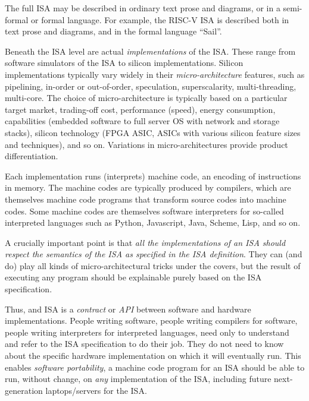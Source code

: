 The full ISA may be described in ordinary text prose and diagrams, or
in a semi-formal or formal language.  For example, the RISC-V ISA is
described both in text prose and diagrams, and in the formal language
``Sail''.


Beneath the ISA level are actual \emph{implementations} of the ISA.
These range from software simulators of the ISA to silicon
implementations.  Silicon implementations typically vary widely in
their \emph{micro-architecture} features, such as pipelining, in-order
or out-of-order, speculation, superscalarity, multi-threading,
multi-core.  The choice of micro-architecture is typically based on a
particular target market, trading-off cost, performance (speed),
energy consumption, capabilities (embedded software to full server OS
with network and storage stacks), silicon technology (FPGA {\vs} ASIC,
ASICs with various silicon feature sizes and techniques), and so on.
Variations in micro-architectures provide product differentiation.


Each implementation runs (interprets) machine code, {\ie} an encoding
of instructions in memory.  The machine codes are typically produced
by compilers, which are themselves machine code programs that
transform source codes into machine codes.  Some machine codes are
themselves software interpreters for so-called interpreted languages
such as Python, Javascript, Java, Scheme, Lisp, and so on.

A crucially important point is that \emph{all the implementations of
an ISA should respect the semantics of the ISA as specified in the ISA
definition}.  They can (and do) play all kinds of micro-architectural
tricks under the covers, but the result of executing any program
should be explainable purely based on the ISA specification.


Thus, and ISA is a \emph{contract} or \emph{API} between software and
hardware implementations.  People writing software, people writing
compilers for software, people writing interpreters for interpreted
languages, {\etc} need only to understand and refer to the ISA
specification to do their job.  They do not need to know about the
specific hardware implementation on which it will eventually run.
This enables \emph{software portability}, {\ie} a machine code program
for an ISA should be able to run, without change, on \emph{any}
implementation of the ISA, including future next-generation
laptops/servers for the ISA.

